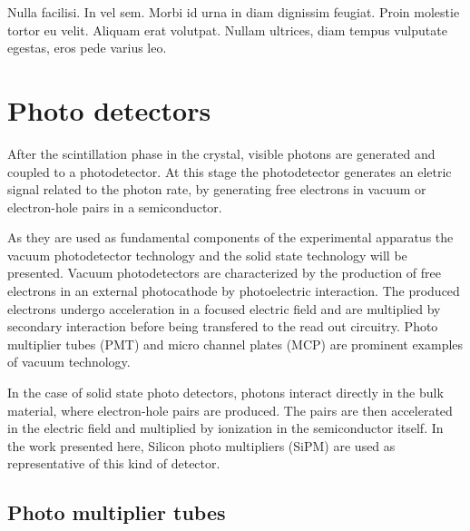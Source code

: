 \begin{savequote}[75mm] 
Nulla facilisi. In vel sem. Morbi id urna in diam dignissim feugiat. Proin molestie tortor eu velit. Aliquam erat volutpat. Nullam ultrices, diam tempus vulputate egestas, eros pede varius leo.
\end{savequote}


\chapter{Photo detectors}
After the scintillation phase in the crystal, visible photons are generated and coupled to a photodetector. At this stage the photodetector generates an eletric signal related to the photon rate, by generating free electrons in vacuum or electron-hole pairs in a semiconductor.

As they are used as fundamental components of the experimental apparatus the vacuum photodetector technology and the solid state technology will be presented.
Vacuum photodetectors are characterized by the production of free electrons in an external photocathode by photoelectric interaction. The produced electrons undergo acceleration in a focused electric field and are multiplied by secondary interaction before being transfered to the read out circuitry. Photo multiplier tubes (PMT) and micro channel plates (MCP) are prominent examples of vacuum technology.
  
In the case of solid state photo detectors, photons interact directly in the bulk material, where electron-hole pairs are produced. The pairs are then accelerated in the electric field and multiplied by ionization in the semiconductor itself. In the work presented here, Silicon photo multipliers (SiPM) are used as representative of this kind of detector.     

\section{Photo multiplier tubes}

